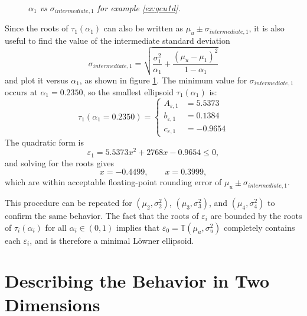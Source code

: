 \begin{example}
\begin{figure}[tbp]
    \caption{\it $\alpha_1$ vs $\sigma_{intermediate,1}$ for example \ref{ex:gcu1d}.}
    \label{fig:alpha1dcurve}
\end{figure}
Since the roots of $\tau_1(\alpha_1)$ can also be written as $\mu_u\pm\sigma_{intermediate,1}$, it is also useful to
find the value of the intermediate standard deviation
\begin{equation}
    \sigma_{intermediate,1} = \sqrt{\frac{\sigma_1^2}{\alpha_1}+\frac{(\mu_u-\mu_1)^2}{1-\alpha_1}}
\end{equation}
and plot it versus $\alpha_1$, as shown in figure \ref{fig:alpha1dcurve}. The minimum value for
$\sigma_{intermediate,1}$ occurs at $\alpha_1=0.2350$, so the smallest ellipsoid $\tau_1(\alpha_1)$ is:
\begin{equation}
    \tau_1(\alpha_1=0.2350) = \left\{
        \begin{aligned}
            A_{\varepsilon,1} &= 5.5373\\
            b_{\varepsilon,1} &= 0.1384\\
            c_{\varepsilon,1} &= -0.9654
        \end{aligned}\right.
\end{equation}
The quadratic form is
\begin{equation}
    \varepsilon_1 = 5.5373x^2+2768x-0.9654 \leq 0,
\end{equation}
and solving for the roots gives
\begin{equation}
    x = -0.4499, \qquad x = 0.3999,
\end{equation}
which are within acceptable floating-point rounding error of $\mu_u\pm\sigma_{intermediate,1}$.

This procedure can be repeated for $(\mu_2,\sigma_2^2)$, $(\mu_3,\sigma_3^2)$, and $(\mu_4,\sigma_4^2)$ to confirm the
same behavior. The fact that the roots of $\varepsilon_i$ are bounded by the roots of $\tau_i(\alpha_i)$ for all
$\alpha_i\in(0,1)$ implies that $\varepsilon_0 = \mathbb{T}\left(\mu_u,\sigma_u^2\right)$ completely contains each
$\varepsilon_i$, and is therefore a minimal L\"owner ellipsoid.

\end{example}

\section{Describing the Behavior in Two Dimensions}


